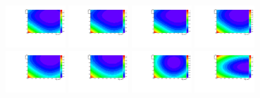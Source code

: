 \begin{figure}[h]
  \centering
\includegraphics[width=0.2\textwidth]{figures/sec-background/correlation/res_th2F_obs_th2f_res_alpha_00_n005.pdf}
\includegraphics[width=0.2\textwidth]{figures/sec-background/correlation/res_th2F_obs_th2f_res_alpha_01_n005.pdf}
\includegraphics[width=0.2\textwidth]{figures/sec-background/correlation/res_th2F_obs_th2f_res_alpha_02_n005.pdf}
\includegraphics[width=0.2\textwidth]{figures/sec-background/correlation/res_th2F_obs_th2f_res_alpha_03_n005.pdf}
\includegraphics[width=0.2\textwidth]{figures/sec-background/correlation/res_th2F_obs_th2f_res_alpha_04_n005.pdf}
\includegraphics[width=0.2\textwidth]{figures/sec-background/correlation/res_th2F_obs_th2f_res_alpha_05_n005.pdf}
\includegraphics[width=0.2\textwidth]{figures/sec-background/correlation/res_th2F_obs_th2f_res_alpha_06_n005.pdf}
\includegraphics[width=0.2\textwidth]{figures/sec-background/correlation/res_th2F_obs_th2f_res_alpha_07_n005.pdf}

\end{figure}
